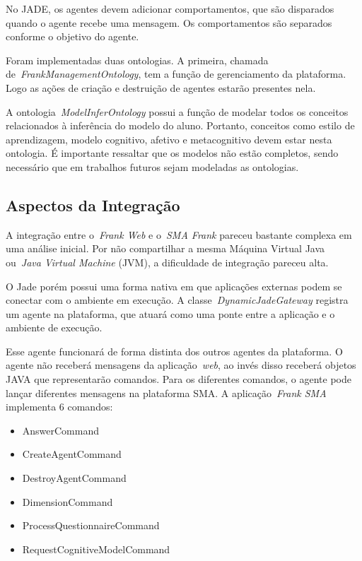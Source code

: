 No JADE, os agentes devem adicionar comportamentos, que são disparados quando o agente recebe uma mensagem. Os comportamentos são separados conforme o objetivo do agente.

Foram implementadas duas ontologias. A primeira, chamada de~\emph{FrankManagementOntology}, tem a função de gerenciamento da plataforma. Logo as ações de criação e destruição de agentes estarão presentes nela.

A ontologia~\emph{ModelInferOntology} possui a função de modelar todos os conceitos relacionados à inferência do modelo do aluno. Portanto, conceitos como estilo de aprendizagem, modelo cognitivo, afetivo e metacognitivo devem estar nesta ontologia. É importante ressaltar que os modelos não estão completos, sendo necessário que em trabalhos futuros sejam modeladas as ontologias.

\subsection{Aspectos da Integração}

A integração entre o~\emph{Frank Web} e o~\emph{SMA Frank} pareceu bastante complexa em uma análise inicial. Por não compartilhar a mesma Máquina Virtual Java ou~\emph{Java Virtual Machine} (JVM), a dificuldade de integração pareceu alta.

O Jade porém possui uma forma nativa em que aplicações externas podem se conectar com o ambiente em execução. A classe~\emph{DynamicJadeGateway} registra um agente na plataforma, que atuará como uma ponte entre a aplicação e o ambiente de execução.

Esse agente funcionará de forma distinta dos outros agentes da plataforma. O agente não receberá mensagens da aplicação~\emph{web}, ao invés disso receberá objetos JAVA que representarão comandos. Para os diferentes comandos, o agente pode lançar diferentes mensagens na plataforma SMA. A aplicação~\emph{Frank SMA} implementa 6 comandos:

\begin{itemize}
	\item AnswerCommand
	\item CreateAgentCommand
	\item DestroyAgentCommand
	\item DimensionCommand
	\item ProcessQuestionnaireCommand
	\item RequestCognitiveModelCommand
\end{itemize}

